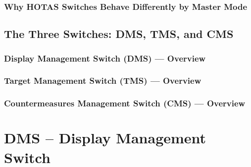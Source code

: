 \documentclass[11pt, a4paper, twoside]{report}
\begin{document}
\subsection{Why HOTAS Switches Behave Differently by Master Mode}

\section{The Three Switches: DMS, TMS, and CMS}

\subsection{Display Management Switch (DMS) — Overview}

\subsection{Target Management Switch (TMS) — Overview}

\subsection{Countermeasures Management Switch (CMS) — Overview}

\newpage

\chapter{DMS -- Display Management Switch}

\end{document}
